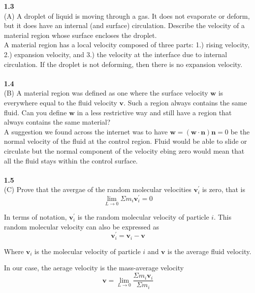 \textbf{1.3}
\\

(A) A droplet of liquid is moving through a gas.
It does not evaporate or deform, but it does have an internal (and surface) circulation.
Describe the velocity of a material region whose surface encloses the droplet.
\\

A material region has a local velocity composed of three parts:
1.) rising velocity, 2.) expansion velocity, and 3.) the velocity at the interface due to internal circulation.
If the droplet is not deforming, then there is no expansion velocity.
\\~\\

\textbf{1.4}
\\

(B) A material region was defined as one where the surface velocity $\mathbf{w}$ is everywhere equal to the
fluid velocity $\mathbf{v}$.
Such a region always contains the same fluid.
Can you define $\mathbf{w}$ in a less restrictive way and still have a region that always contains the same material?
\\

A suggestion we found across the internet was to have $\mathbf{w} = \left(\mathbf{w}\cdot\mathbf{n}\right)\mathbf{n} = 0$ be
the normal velocity of the fluid at the control region.
Fluid would be able to slide or circulate but the normal component of the velocity ebing zero would mean that all the fluid stays within
the control surface.
\\~\\


\textbf{1.5}
\\

(C) Prove that the avergae of the random molecular velocities $\mathbf{v}^{\prime}_{i}$ is zero, that is
$$
\lim_{L\rightarrow 0} \Sigma m_i \mathbf{v}^{\prime}_{i} = 0
$$

In terms of notation, $\mathbf{v}^{\prime}_{i}$ is the random molecular velocity of particle $i$.
This random molecular velocity can also be expressed as
$$
\mathbf{v}^{\prime}_{i} = \mathbf{v}_i - \mathbf{v}
$$

Where $\mathbf{v}_i$ is the molecular velocity of particle $i$ and $\mathbf{v}$ is the average fluid velocity.

In our case, the aerage velocity is the mass-average velocity
$$
\mathbf{v} = \lim_{L\rightarrow 0} \frac{\Sigma m_i \mathbf{v}_i}{\Sigma m_i}
$$